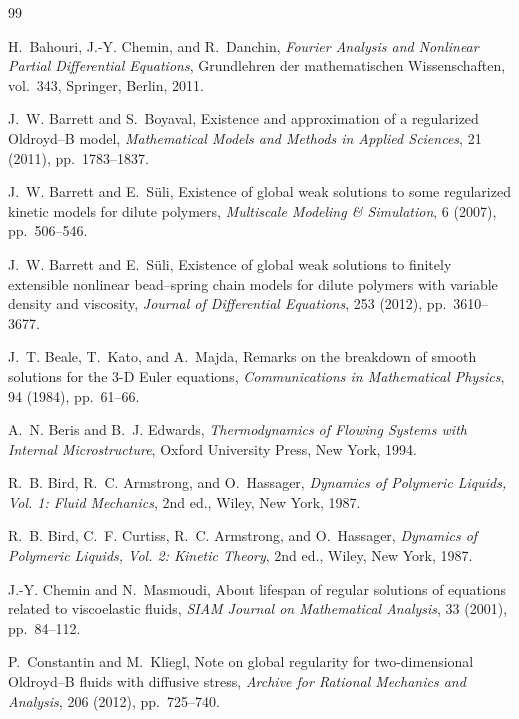 \documentclass[11pt]{article}
\begin{document}
\begin{thebibliography}{99}

H.~Bahouri, J.-Y. Chemin, and R.~Danchin,
\newblock \emph{Fourier Analysis and Nonlinear Partial Differential Equations},
\newblock Grundlehren der mathematischen Wissenschaften, vol.~343, Springer,
Berlin, 2011.

J.~W. Barrett and S.~Boyaval,
\newblock Existence and approximation of a regularized Oldroyd--B model,
\newblock \emph{Mathematical Models and Methods in Applied Sciences}, 21
(2011), pp.~1783--1837.

J.~W. Barrett and E.~S\"uli,
\newblock Existence of global weak solutions to some regularized kinetic models
for dilute polymers,
\newblock \emph{Multiscale Modeling \& Simulation}, 6 (2007), pp.~506--546.

J.~W. Barrett and E.~S\"uli,
\newblock Existence of global weak solutions to finitely extensible nonlinear
bead--spring chain models for dilute polymers with variable density and
viscosity,
\newblock \emph{Journal of Differential Equations}, 253 (2012), pp.~3610--3677.

J.~T. Beale, T.~Kato, and A.~Majda,
\newblock Remarks on the breakdown of smooth solutions for the 3-D Euler
equations,
\newblock \emph{Communications in Mathematical Physics}, 94 (1984), pp.~61--66.

A.~N. Beris and B.~J. Edwards,
\newblock \emph{Thermodynamics of Flowing Systems with Internal Microstructure},
\newblock Oxford University Press, New York, 1994.

R.~B. Bird, R.~C. Armstrong, and O.~Hassager,
\newblock \emph{Dynamics of Polymeric Liquids, Vol. 1: Fluid Mechanics},
\newblock 2nd ed., Wiley, New York, 1987.

R.~B. Bird, C.~F. Curtiss, R.~C. Armstrong, and O.~Hassager,
\newblock \emph{Dynamics of Polymeric Liquids, Vol. 2: Kinetic Theory},
\newblock 2nd ed., Wiley, New York, 1987.

J.-Y. Chemin and N.~Masmoudi,
\newblock About lifespan of regular solutions of equations related to
viscoelastic fluids,
\newblock \emph{SIAM Journal on Mathematical Analysis}, 33 (2001), pp.~84--112.

P.~Constantin and M.~Kliegl,
\newblock Note on global regularity for two-dimensional Oldroyd--B fluids with
diffusive stress,
\newblock \emph{Archive for Rational Mechanics and Analysis}, 206 (2012),
pp.~725--740.


\end{thebibliography}
\end{document}
